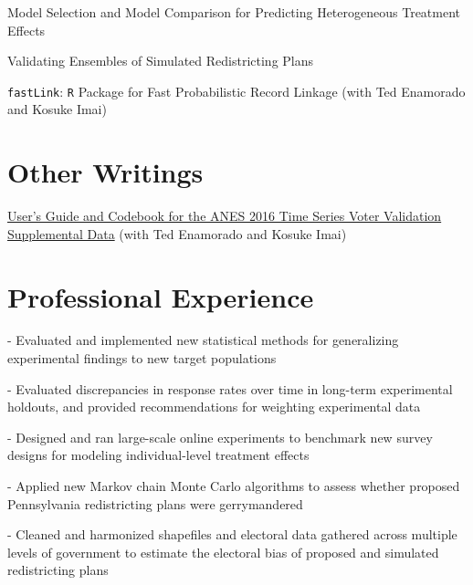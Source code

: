 \documentclass[]{deedy-resume-openfont}
\begin{document}
Model Selection and Model Comparison for Predicting Heterogeneous Treatment Effects\\\vspace{2mm}

Validating Ensembles of Simulated Redistricting Plans\\\vspace{2mm}

\texttt{fastLink}: \texttt{R} Package for Fast Probabilistic Record Linkage (with Ted Enamorado and Kosuke Imai)\\\vspace{2mm}
\sectionsep

\section{Other Writings}
\href{https://www.electionstudies.org/wp-content/uploads/2018/03/anes_timeseries_2016voteval_userguidecodebook.pdf}{User’s Guide and Codebook for the ANES 2016 Time Series Voter Validation Supplemental Data} (with Ted Enamorado and Kosuke Imai)
\sectionsep


\section{Professional Experience}
\begin{tightemize}
\item[-] Evaluated and implemented new statistical methods for generalizing experimental findings to new target populations
\item[-] Evaluated discrepancies in response rates over time in long-term experimental holdouts, and provided recommendations for weighting experimental data 
\item[-] Designed and ran large-scale online experiments to benchmark new survey designs for modeling individual-level treatment effects
\end{tightemize}
\sectionsep

\begin{tightemize}
\item[-] Applied new Markov chain Monte Carlo algorithms to assess whether proposed Pennsylvania redistricting plans were gerrymandered
\item[-] Cleaned and harmonized shapefiles and electoral data gathered across multiple levels of government to estimate the electoral bias of proposed and simulated redistricting plans
\end{tightemize}
\sectionsep
\end{document}
